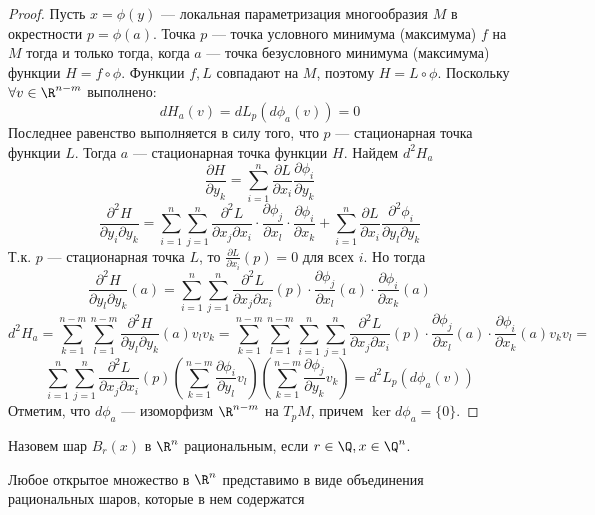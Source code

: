 \begin{proof}
    Пусть \(x = \phi(y)\) --- локальная параметризация многообразия \(M\) в окрестности \(p = \phi(a)\). Точка \(p\) --- точка условного минимума (максимума) \(f\) на \(M\) тогда и только тогда, когда \(a\) --- точка безусловного минимума (максимума) функции \(H = f \circ \phi\). Функции \(f, L\) совпадают на \(M\), поэтому \(H = L \circ \phi\). Поскольку \(\forall v \in \R^{n - m}\) выполнено:
    \[dH_a(v) = dL_p(d\phi_a(v)) = 0\]
    Последнее равенство выполняется в силу того, что \(p\) --- стационарная точка функции \(L\). Тогда \(a\) --- стационарная точка функции \(H\). Найдем \(d^2H_a\)
    \[\frac{\partial H}{\partial y_k} = \sum_{i = 1}^n \frac{\partial L}{\partial x_i} \frac{\partial \phi_i}{\partial y_k}\]
    \[\frac{\partial^2 H}{\partial y_i \partial y_k} = \sum_{i = 1}^n \sum_{j = 1}^n \frac{\partial^2 L}{\partial x_j \partial x_i}\cdot \frac{\partial \phi_j}{\partial x_l}\cdot \frac{\partial \phi_i}{\partial x_k} + \sum_{i = 1}^n \frac{\partial L}{\partial x_i} \frac{\partial^2 \phi_i}{\partial y_l \partial y_k}\]
    Т.к. \(p\) --- стационарная точка \(L\), то \(\frac{\partial L}{\partial x_i}(p) = 0\) для всех \(i\). Но тогда
    \[\frac{\partial^2 H}{\partial y_l \partial y_k}(a) = \sum_{i = 1}^n \sum_{j = 1}^n \frac{\partial^2 L}{\partial x_j \partial x_i}(p)\cdot \frac{\partial \phi_j}{\partial x_l}(a)\cdot \frac{\partial \phi_i}{\partial x_k}(a)\]
    \[d^2H_a = \sum_{k = 1}^{n - m}\sum_{l = 1}^{n - m}\frac{\partial^2 H}{\partial y_l \partial y_k}(a)v_lv_k = \sum_{k = 1}^{n - m}\sum_{l = 1}^{n - m}\sum_{i = 1}^n \sum_{j = 1}^n \frac{\partial^2 L}{\partial x_j \partial x_i}(p)\cdot \frac{\partial \phi_j}{\partial x_l}(a)\cdot \frac{\partial \phi_i}{\partial x_k}(a)v_kv_l = \]
    \[\sum_{i = 1}^n \sum_{j = 1}^n \frac{\partial^2 L}{\partial x_j \partial x_i}(p)\left( \sum_{k = 1}^{n - m} \frac{\partial \phi_i}{\partial y_l}v_l \right)\left( \sum_{k = 1}^{n - m} \frac{\partial \phi_j}{\partial y_k}v_k \right) = d^2L_p(d\phi_a(v))\]
    Отметим, что \(d\phi_a\) --- изоморфизм \(\R^{n - m}\) на \(T_pM\), причем \(\ker d\phi_a = \{0\}\).
\end{proof}

\begin{definition}
    Назовем шар \(B_r(x)\) в \(\R^n\) рациональным, если \(r \in \Q, x \in \Q^n\).
\end{definition}

\begin{note}
    Любое открытое множество в \(\R^n\) представимо в виде объединения рациональных шаров, которые в нем содержатся
\end{note}

